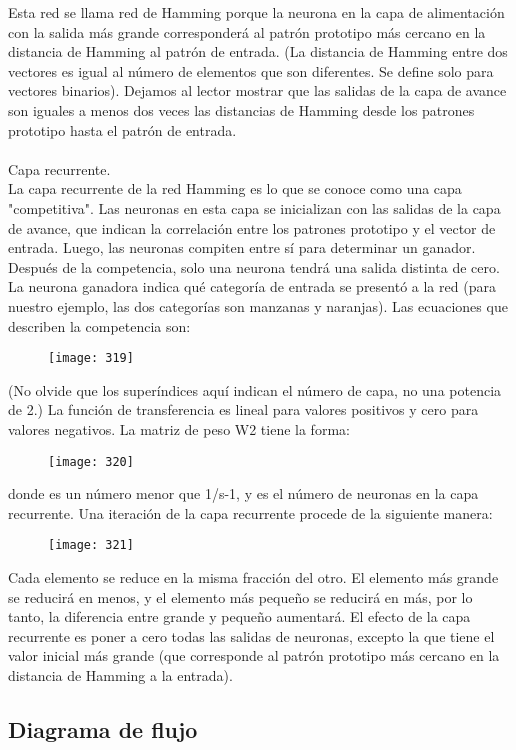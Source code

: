 \documentclass[]{article}
\begin{document}
Esta red se llama red de Hamming porque la neurona en la capa de alimentación con la salida más grande corresponderá al patrón prototipo más cercano en la distancia de Hamming al patrón de entrada. (La distancia de Hamming entre dos vectores es igual al número de elementos que son diferentes. Se define solo para vectores binarios). Dejamos al lector mostrar que las salidas de la capa de avance son iguales a menos dos veces las distancias de Hamming desde los patrones prototipo hasta el patrón de entrada.\\\\
Capa recurrente.\\ La capa recurrente de la red Hamming es lo que se conoce como una capa "competitiva". Las neuronas en esta capa se inicializan con las salidas de la capa de avance, que indican la correlación entre los patrones prototipo y el vector de entrada. Luego, las neuronas compiten entre sí para determinar un ganador. Después de la competencia, solo una neurona tendrá una salida distinta de cero. La neurona ganadora indica qué categoría de entrada se presentó a la red (para nuestro ejemplo, las dos categorías son manzanas y naranjas). Las ecuaciones que describen la competencia son:
\begin{figure}[h]
	\centering
	\texttt{[image: 319]}
\end{figure}
(No olvide que los superíndices aquí indican el número de capa, no una potencia de 2.) La función de transferencia es lineal para valores positivos y cero para valores negativos. La matriz de peso W2 tiene la forma:
\begin{figure}[h]
	\centering
	\texttt{[image: 320]}
\end{figure}
donde es un número menor que 1/s-1, y es el número de neuronas en la capa recurrente.
Una iteración de la capa recurrente procede de la siguiente manera:
\begin{figure}[h]
	\centering
	\texttt{[image: 321]}
\end{figure}
Cada elemento se reduce en la misma fracción del otro. El elemento más grande se reducirá en menos, y el elemento más pequeño se reducirá en más, por lo tanto, la diferencia entre grande y pequeño aumentará. El efecto de la capa recurrente es poner a cero todas las salidas de neuronas, excepto la que tiene el valor inicial más grande (que corresponde al patrón prototipo más cercano en la distancia de Hamming a la entrada).
\subsection{Diagrama de flujo}
\end{document}

